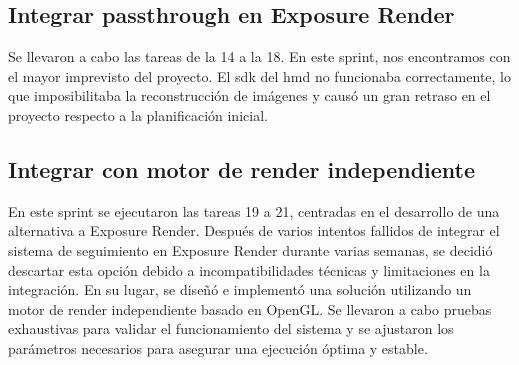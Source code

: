 \subsection{Integrar passthrough en Exposure Render}
Se llevaron a cabo las tareas de la 14 a la 18. En este sprint, nos encontramos con el mayor imprevisto del proyecto. El \acrshort{sdk} del \acrshort{hmd} no funcionaba correctamente, lo que imposibilitaba la reconstrucción de imágenes y causó un gran retraso en el proyecto respecto a la planificación inicial.

\subsection{Integrar con motor de render independiente}
En este sprint se ejecutaron las tareas 19 a 21, centradas en el desarrollo de una alternativa a Exposure Render. Después de varios intentos fallidos de integrar el sistema de seguimiento en Exposure Render durante varias semanas, se decidió descartar esta opción debido a incompatibilidades técnicas y limitaciones en la integración. En su lugar, se diseñó e implementó una solución utilizando un motor de render independiente basado en OpenGL. Se llevaron a cabo pruebas exhaustivas para validar el funcionamiento del sistema y se ajustaron los parámetros necesarios para asegurar una ejecución óptima y estable.


